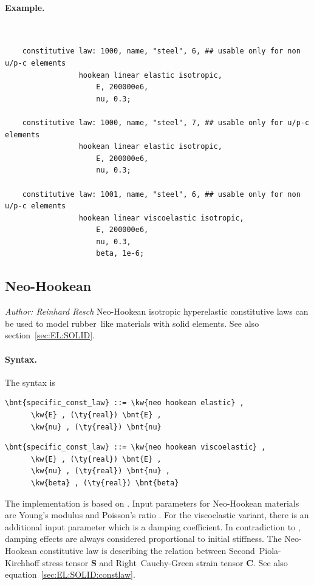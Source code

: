 \paragraph{Example.} \
\begin{verbatim}
    constitutive law: 1000, name, "steel", 6, ## usable only for non u/p-c elements
                 hookean linear elastic isotropic,
                     E, 200000e6,
                     nu, 0.3;

    constitutive law: 1000, name, "steel", 7, ## usable only for u/p-c elements
                 hookean linear elastic isotropic,
                     E, 200000e6,
                     nu, 0.3;

    constitutive law: 1001, name, "steel", 6, ## usable only for non u/p-c elements
                 hookean linear viscoelastic isotropic,
                     E, 200000e6,
                     nu, 0.3,
                     beta, 1e-6;
\end{verbatim}

\subsection{Neo-Hookean}
\label{sec:CL:neo-hookean}
\emph{Author: Reinhard Resch}
Neo-Hookean isotropic hyperelastic constitutive laws can be used to model rubber~like materials with solid elements.
See also section~\ref{sec:EL:SOLID}.

\paragraph{Syntax.}
The syntax is
\begin{Verbatim}[commandchars=\\\{\}]
    \bnt{specific_const_law} ::= \kw{neo hookean elastic} ,
      \kw{E} , (\ty{real}) \bnt{E} ,
      \kw{nu} , (\ty{real}) \bnt{nu}
\end{Verbatim}

\begin{Verbatim}[commandchars=\\\{\}]
    \bnt{specific_const_law} ::= \kw{neo hookean viscoelastic} ,
      \kw{E} , (\ty{real}) \bnt{E} ,
      \kw{nu} , (\ty{real}) \bnt{nu} ,
      \kw{beta} , (\ty{real}) \bnt{beta}
\end{Verbatim}
The implementation is based on \cite{KUEBLER2005}. Input parameters for Neo-Hookean materials are Young's modulus 
and Poisson's ratio \nt{nu}.
For the viscoelastic variant, there is an additional input parameter  which is a damping coefficient.
In contradiction to \cite{KUEBLER2005}, damping effects are always considered proportional to initial stiffness.
The Neo-Hookean constitutive law is describing the relation between
Second~Piola-Kirchhoff stress tensor $\boldsymbol{S}$ and Right~Cauchy-Green strain tensor $\boldsymbol{C}$.
See also equation~\ref{sec:EL:SOLID:constlaw}.

